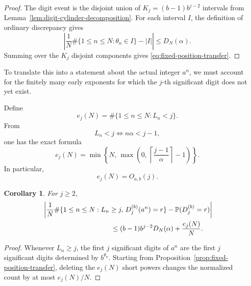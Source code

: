 \documentclass[11pt]{article}
\newtheorem{corollary}[theorem]{Corollary}
\theoremstyle{definition}
\theoremstyle{remark}
\begin{document}
\begin{proof}
The digit event is the disjoint union of
\(K_j=(b-1)b^{j-2}\) intervals from
Lemma~\ref{lem:digit-cylinder-decomposition}.
For each interval \(I\), the definition of ordinary discrepancy gives
\[
    \left|
        \frac1N
        \#\{1\le n\le N:\theta_n\in I\}
        -
        |I|
    \right|
    \le
    D_N(\alpha).
\]
Summing over the \(K_j\) disjoint components gives
\eqref{eq:fixed-position-transfer}.
\end{proof}

To translate this into a statement about the actual integer \(a^n\),
we must account for the finitely many early exponents for which the
\(j\)-th significant digit does not yet exist.

Define
\begin{equation}
    e_j(N)
    =
    \#\{1\le n\le N:L_n<j\}.
    \label{eq:e-j-definition}
\end{equation}
From
\[
    L_n<j
    \iff
    n\alpha<j-1,
\]
one has the exact formula
\begin{equation}
    e_j(N)
    =
    \min
    \left\{
        N,\,
        \max
        \left(
            0,\,
            \left\lceil
                \frac{j-1}{\alpha}
            \right\rceil-1
        \right)
    \right\}.
    \label{eq:e-j-exact}
\end{equation}
In particular,
\begin{equation}
    e_j(N)=O_{a,b}(j).
    \label{eq:e-j-big-O}
\end{equation}

\begin{corollary}
\label{cor:actual-fixed-position-transfer}
For \(j\ge2\),
\begin{equation}
\begin{aligned}
&\left|
    \frac1N
    \#\{
        1\le n\le N:
        L_n\ge j,\,
        D_j^{(b)}(a^n)=r
    \}
    -
    \mathbb P(D_j^{(b)}=r)
\right|
\\
&\hspace{35mm}
\le
    (b-1)b^{j-2}D_N(\alpha)
    +
    \frac{e_j(N)}{N}.
\end{aligned}
\label{eq:actual-fixed-position-transfer}
\end{equation}
\end{corollary}

\begin{proof}
Whenever \(L_n\ge j\), the first \(j\) significant digits of
\(a^n\) are the first \(j\) significant digits determined by
\(b^{\theta_n}\).  Starting from
Proposition~\ref{prop:fixed-position-transfer}, deleting the
\(e_j(N)\) short powers changes the normalized count by at most
\(e_j(N)/N\).
\end{proof}
\end{document}

